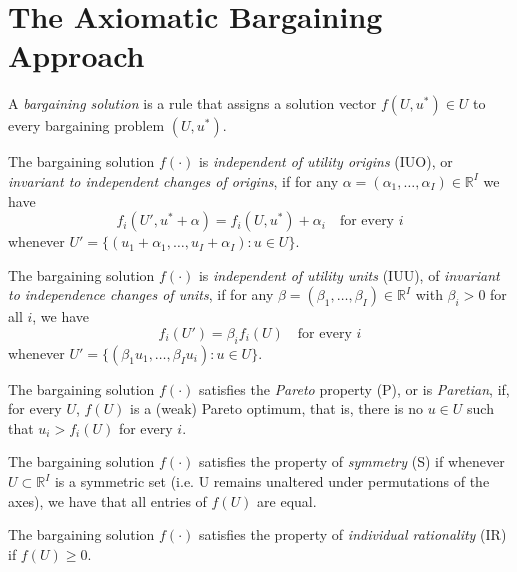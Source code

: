 \section{The Axiomatic Bargaining Approach}

\begin{defn}
    A \emph{bargaining solution} is a rule that assigns a solution vector $f(U, u^*) \in U$ to every bargaining problem $(U, u^*)$.
\end{defn}

\begin{defn}
    The bargaining solution $f(\cdot)$ is \emph{independent of utility origins} (IUO), or \emph{invariant to independent changes of origins}, if for any $\alpha = (\alpha_1, \dots, \alpha_I) \in \mathbb{R}^I$ we have
    \begin{equation*}
        f_i(U', u^* + \alpha) = f_i(U, u^*) + \alpha_i \quad \text{for every } i
    \end{equation*}
    whenever $U' = \{(u_1 + \alpha_1, \dots, u_I + \alpha_I) : u \in U\}$.
\end{defn}

\begin{defn}
    The bargaining solution $f(\cdot)$ is \emph{independent of utility units} (IUU), of \emph{invariant to independence changes of units}, if for any $\beta = (\beta_1, \dots, \beta_I) \in \mathbb{R}^I$ with $\beta_i > 0$ for all $i$, we have
    \begin{equation*}
        f_i (U') = \beta_i f_i (U) \quad \text{for every } i
    \end{equation*}
    whenever $U' = \{(\beta_1 u_1, \dots, \beta_I u_i) : u \in U\}$.
\end{defn}

\begin{defn}
    The bargaining solution $f(\cdot)$ satisfies the \emph{Pareto} property (P), or is \emph{Paretian}, if, for every $U$, $f(U)$ is a (weak) Pareto optimum, that is, there is no $u \in U$ such that $u_i > f_i(U)$ for every $i$.
\end{defn}

\begin{defn}
    The bargaining solution $f(\cdot)$ satisfies the property of \emph{symmetry} (S) if whenever $U \subset \mathbb{R}^I$ is a symmetric set (i.e. U remains unaltered under permutations of the axes), we have that all entries of $f(U)$ are equal.
\end{defn}

\begin{defn}
    The bargaining solution $f(\cdot)$ satisfies the property of \emph{individual rationality} (IR) if $f(U) \geq 0$.
\end{defn}

